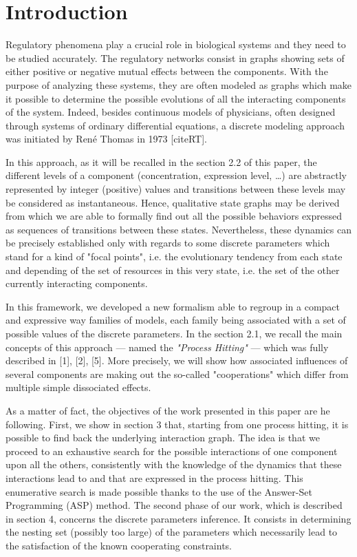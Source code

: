 \section{Introduction}
Regulatory phenomena play a crucial role in biological systems and they need to be studied accurately. The regulatory networks consist in graphs showing sets of either positive or negative mutual effects between the components.
With the purpose of analyzing these systems, they are often modeled as graphs which make it possible to determine the possible evolutions of all the interacting components of the system.
Indeed, besides continuous models of physicians, often designed through systems of ordinary differential equations, a discrete modeling approach was initiated by René Thomas in 1973 [cite{RT}].

In this approach, as it will be recalled in the section 2.2 of this paper, the different levels of a component (concentration, expression level, …) are abstractly represented by integer (positive) values and transitions between these levels may be considered as instantaneous. Hence, qualitative state graphs may be derived from which we are able to formally find out all the possible behaviors expressed as sequences of transitions between these states. Nevertheless, these dynamics can be precisely established only with regards to some discrete parameters which stand for a kind of "focal points", i.e. the evolutionary tendency from each state and depending of the set of resources in this very state, i.e. the set of the other currently interacting components.

In this framework, we developed a new formalism able to regroup in a compact and expressive way families of models, each family being associated with a set of possible values of the discrete parameters. In the section 2.1, we recall the main concepts of this approach --- named the {\em "Process Hitting"} --- which was fully described in [1], [2], [5]. More precisely, we will show how associated influences of several components are making out the so-called "cooperations" which differ from multiple simple dissociated effects.

As a matter of fact, the objectives of the work presented in this paper are he following.
First, we show in section 3 that, starting from one process hitting, it is possible to find back the underlying interaction graph. The idea is that we proceed to an exhaustive search for the possible interactions of one component upon all the others, consistently with the knowledge of the dynamics that these interactions lead to and that are expressed in the process hitting. This enumerative search is made possible thanks to the use of the Answer-Set Programming (ASP) method.
The second phase of our work, which is described in section 4, concerns the discrete parameters inference. It consists in determining the nesting set (possibly too large) of the parameters which necessarily lead to the satisfaction of the known cooperating constraints. 

